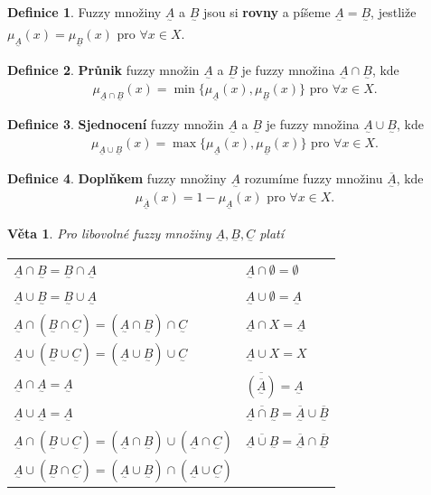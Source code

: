 \documentclass[a4]{report}
\newcommand{\fA}{\underset{^\sim}A}
\newcommand{\fB}{\underset{^\sim}B}
\newcommand{\fC}{\underset{^\sim}C}
\newcommand{\muA}{\mu_{\fA}}
\newcommand{\muB}{\mu_{\fB}}
\newtheorem{theorem}{Věta}
\theoremstyle{definition}
\newtheorem{definition}{Definice}[section]
\begin{document}
{\begin{definition}
Fuzzy množiny $\fA$ a $\fB$ jsou si \textbf{rovny} a píšeme $\fA = \fB$, jestliže $\muA(x) = \muB(x)$ pro $\forall x \in X$.
\end{definition}

\begin{definition}
\textbf{Průnik} fuzzy množin $\fA$ a $\fB$ je fuzzy množina $\fA \cap \fB$, kde
\begin{equation*}
\mu_{\fA \cap \fB}(x) = \min \lbrace \muA(x), \muB(x) \rbrace \text{ pro } \forall x \in X.
\end{equation*}
\end{definition}

\begin{definition}
\textbf{Sjednocení} fuzzy množin $\fA$ a $\fB$ je fuzzy množina $\fA \cup \fB$, kde
\begin{equation*}
\mu_{\fA \cup \fB}(x) = \max \lbrace \muA(x), \muB(x) \rbrace \text{ pro } \forall x \in X.
\end{equation*}
\end{definition}

\begin{definition}
\textbf{Doplňkem} fuzzy množiny $\fA$ rozumíme fuzzy množinu $\overline{\fA}$, kde
\begin{equation*}
\mu_{\overline{\fA}}(x) = 1 - \muA(x) \text{ pro } \forall x \in X.
\end{equation*}
\end{definition}

\begin{theorem}
Pro libovolné fuzzy množiny $\fA, \fB, \fC$ platí
\begin{table}[H]
\centering
\begin{tabular}{ll}
$\fA \cap \fB = \fB \cap \fA$                                 & $\fA \cap \emptyset = \emptyset$                             \\
$\fA \cup \fB = \fB \cup \fA$                                 & $\fA \cup \emptyset = \fA$                                   \\
$\fA \cap (\fB \cap \fC) = (\fA \cap \fB) \cap \fC$           & $\fA \cap X = \fA$                                           \\
$\fA \cup (\fB \cup \fC) = (\fA \cup \fB) \cup \fC$           & $\fA \cup X= X$                                              \\
$\fA \cap \fA = \fA$                                          & $\overline{(\overline{\fA})} = \fA$                          \\
$\fA \cup \fA = \fA$                                          & $\overline{\fA \cap \fB}=\overline{\fA} \cup \overline{\fB}$ \\
$\fA \cap (\fB \cup \fC)= (\fA \cap \fB) \cup (\fA \cap \fC)$ & $\overline{\fA \cup \fB}=\overline{\fA} \cap \overline{\fB}$ \\
$\fA \cup (\fB \cap \fC)= (\fA \cup \fB) \cap (\fA \cup \fC)$ &                                                             
\end{tabular}
\end{table}
\end{theorem}


}
\end{document}
